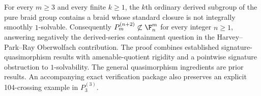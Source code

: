 For every $m\geq3$ and every finite $k\geq1$, the $k$th ordinary
derived subgroup of the pure braid group contains a braid whose standard
closure is not integrally smoothly $1$-solvable. Consequently
$P_m^{(n+2)}\not\subset\F_n^m$ for every integer $n\geq1$,
answering negatively the derived-series containment question in the
Harvey--Park--Ray Oberwolfach contribution.
The proof combines established signature-quasimorphism results with
amenable-quotient rigidity and a pointwise signature obstruction to
$1$-solvability. The general quasimorphism ingredients are prior results.
An accompanying exact verification package also preserves an explicit
104-crossing example in $P_3^{(3)}$.
